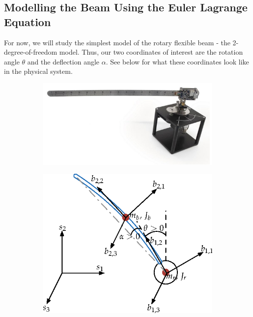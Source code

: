 \subsection{Modelling the Beam Using the Euler Lagrange Equation}
For now, we will study the simplest model of the rotary flexible beam - the 2-degree-of-freedom model. Thus, our two coordinates of interest are the rotation angle \( \theta \) and the deflection angle \( \alpha \). See below for what these coordinates look like in the physical system.
\begin{figure}[htb!]
    \centering
    \begin{subfigure}{.4\textwidth}
        \centering
        \includegraphics[width=\textwidth]{eps/lab_1/quanser.eps}
        \caption{}
    \end{subfigure}\hfill
    \begin{subfigure}{,4\textwidth}
        \centering
        \includegraphics[width=\textwidth]{eps/lab_1/rotary_flexible_beam_edit.eps}

\end{subfigure}
\end{figure}
